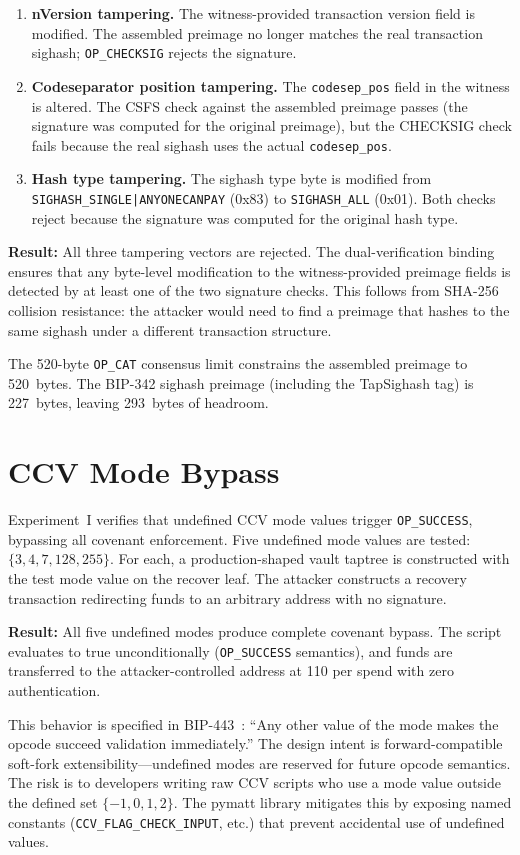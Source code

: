 \begin{enumerate}
\item \textbf{nVersion tampering.} The witness-provided transaction version field
  is modified. The assembled preimage no longer matches the real transaction sighash;
  \texttt{OP\_CHECKSIG} rejects the signature.

\item \textbf{Codeseparator position tampering.} The \texttt{codesep\_pos} field in
  the witness is altered. The CSFS check against the assembled preimage passes (the
  signature was computed for the original preimage), but the CHECKSIG check fails
  because the real sighash uses the actual \texttt{codesep\_pos}.

\item \textbf{Hash type tampering.} The sighash type byte is modified from
  \texttt{SIGHASH\_SINGLE\allowbreak|ANYONECANPAY} (0x83) to \texttt{SIGHASH\_ALL} (0x01).
  Both checks reject because the signature was computed for the original hash type.
\end{enumerate}

\textbf{Result:} All three tampering vectors are rejected. The dual-verification
binding ensures that any byte-level modification to the witness-provided preimage
fields is detected by at least one of the two signature checks. This follows from
SHA-256 collision resistance: the attacker would need to find a preimage that hashes
to the same sighash under a different transaction structure.

The 520-byte \texttt{OP\_CAT} consensus limit constrains the assembled preimage to
520~bytes. The BIP-342 sighash preimage (including the TapSighash tag) is 227~bytes,
leaving 293~bytes of headroom.

\section{CCV Mode Bypass} \label{ase:mode_bypass}

Experiment~I verifies that undefined CCV mode values trigger \texttt{OP\_SUCCESS},
bypassing all covenant enforcement. Five undefined mode values are tested:
$\{3, 4, 7, 128, 255\}$. For each, a production-shaped vault taptree is constructed
with the test mode value on the recover leaf. The attacker constructs a recovery
transaction redirecting funds to an arbitrary address with no signature.

\textbf{Result:} All five undefined modes produce complete covenant bypass. The
script evaluates to true unconditionally (\texttt{OP\_SUCCESS} semantics), and funds
are transferred to the attacker-controlled address at 110\vB{} per spend with zero
authentication.

This behavior is specified in BIP-443~\cite{BIP443}: ``Any other value of the mode
makes the opcode succeed validation immediately.'' The design intent is
forward-compatible soft-fork extensibility---undefined modes are reserved for future
opcode semantics. The risk is to developers writing raw CCV scripts who use a mode
value outside the defined set $\{-1, 0, 1, 2\}$. The pymatt library mitigates this
by exposing named constants (\texttt{CCV\_FLAG\_CHECK\_INPUT}, etc.) that prevent
accidental use of undefined values.
